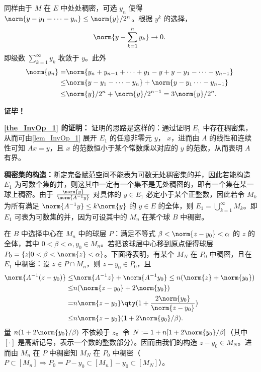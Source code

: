 同样由于 $M$ 在 $E$ 中处处稠密，可选 $y_n$ 使得 $\norm{y-y_1-\cdots-y_n}\leq\norm{y}/2^n$。根据 $y^k$ 的选择，
\begin{equation}
\norm{y-\sum_{k=1}^n y_k}\rightarrow0.~
\end{equation}
即级数 $\sum_{k=1}^\infty y_k$ 收敛于 $y$。此外
\begin{equation}
\begin{aligned}
\norm{y_n}=&\norm{y_n+y_{n-1}+\cdots+y_1-y+y-y_1-\cdots-y_{n-1}}\\
\leq&\norm{y-y_1-\cdots-y_{n}}+\norm{y-y_1\cdots-y_{n-1}}\\
\leq&\norm{y}/2^n+\norm{y}/2^{n-1}=3\norm{y}/2^n.
\end{aligned}~
\end{equation}

\textbf{证毕！}

\textbf{\autoref{the_InvOp_1} 的证明：}
证明的思路是这样的：通过证明 $E_1$ 中存在稠密集，从而可由\autoref{lem_InvOp_1} 展开 $E_1$ 的任意非零元 $y$， $x$，进而由 $A$ 的线性和连续性可知 $Ax=y$，且 $x$ 的范数恒小于某个常数乘以对应的 $y$ 的范数，从而表明 $A$ 有界。

\textbf{稠密集的构造：}断定完备赋范空间不能表为可数无处稠密集的并，因此若能构造 $E_1$ 为可数个集的并，则这其中一定有一个集不是无处稠密的，即有一个集在某一球上稠密。由于 $\frac{\norm{y}}{\norm{A^{-1}y}}$ 对具体的 $y\in E_1$ 必定小于某个正整数，因此若令 $M_k$ 为所有满足 $\norm{A^{-1}y}\leq k\norm{y}$ 的 $y\in E$ 的全体，则 $E_1=\bigcup\limits_{k=1}^\infty M_k$。即 $E_1$ 可表为可数集的并，因为可设其中的 $M_n$ 在某个球 $B$ 中稠密。

在 $B$ 中选择中心在 $M_n$ 中的球层 $P$：满足不等式 $\beta<\norm{z-y_0}<\alpha$ 的 $z$ 的全体，其中 $0<\beta<\alpha,y_0\in M_n$。若把该球层中心移到原点便得球层 $P_0=\{z|0<\beta<\norm{z}<\alpha\}$。下面将表明，有某个 $M_N$ 在 $P_0$ 中稠密，且在 $E_1$ 中稠密：设 $z\in P\cap M_n$，则 $z-y_0\in P_0$，且
\begin{equation}
\begin{aligned}
\norm{A^{-1}(z-y_0)}\leq&\norm{A^{-1}z}+\norm{A^{-1}y_0}\leq n(\norm{z}+\norm{y_0})\\
\leq&n(\norm{z-y_0}+2\norm{y_0})\\
=&n\norm{z-y_0}\qty(1+\frac{2\norm{y_0}}{\norm{z-y_0}})\\
\leq& n\norm{z-y_0}(1+2\norm{y_0}/\beta).
\end{aligned}~
\end{equation}
量 $n(1+2\norm{y_0}/\beta)$ 不依赖于 $z$。令 $N:=1+n[1+2\norm{y_0}/\beta]$（其中 $[\cdot]$ 是高斯记号，表示一个数的整数部分）。因而由我们的构造 $z-y_0\in M_N$。进而由 $M_n$ 在 $P$ 中稠密知 $M_N$ 在 $P_0$ 中稠密（$P\subset[M_n]\Rightarrow P_0=P-y_0\subset[M_n]-y_0\subset[M_N]$）。

